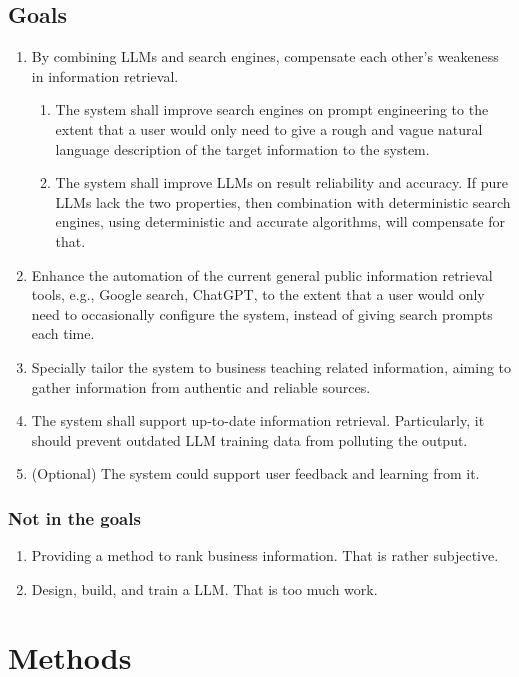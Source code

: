 \documentclass[final-report]{report-template}
\begin{document}
\subsection{Goals} \label{sec.intro.goals}
\begin{enumerate}
	\item By combining LLMs and search engines, compensate each other's
		weakeness in information retrieval.
		\begin{enumerate}
		\item The system shall improve search engines on prompt engineering to
			the extent that a user would only need to give a rough and vague
			natural language description of the target information to the
			system.
		\item The system shall improve LLMs on result reliability and
			accuracy. If pure LLMs lack the two properties, then combination
			with deterministic search engines, using deterministic and accurate
			algorithms, will compensate for that.
		\end{enumerate}
	\item Enhance the automation of the current general public information
		retrieval tools, e.g., Google search, ChatGPT, to the extent that a
		user would only need to occasionally configure the system, instead of
		giving search prompts each time.
	\item Specially tailor the system to business teaching related information,
		aiming to gather information from authentic and reliable sources.
	\item The system shall support up-to-date information retrieval.
		Particularly, it should prevent outdated LLM training data from polluting
		the output.
	\item (Optional) The system could support user feedback and learning from
		it.
\end{enumerate}

\subsubsection{Not in the goals}
\begin{enumerate}
	\item Providing a method to rank business information. That is rather
		subjective.
	\item Design, build, and train a LLM. That is too much work.
\end{enumerate}

\section{Methods} 
\end{document}

